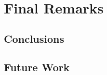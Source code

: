 \chapter{Final Remarks}\label{ch:final-remarks}


\section{Conclusions}\label{sec:conclusions}


\section{Future Work}\label{sec:future-work}
